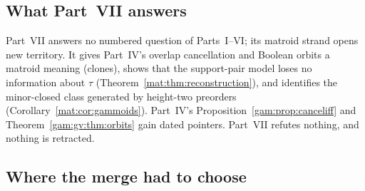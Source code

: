 \documentclass[11pt]{article}
\numberwithin{equation}{section}
\theoremstyle{definition}
\begin{document}
\subsection{What Part~VII answers}
\label{mat:sec:answers}
Part~VII answers no numbered question of Parts~I--VI; its matroid strand
opens new territory. It gives Part~IV's overlap cancellation and Boolean
orbits a matroid meaning (clones), shows that the support-pair model loses
no information about $\tau$ (Theorem~\ref{mat:thm:reconstruction}), and
identifies the minor-closed class generated by height-two preorders
(Corollary~\ref{mat:cor:gammoids}). Part~IV's
Proposition~\ref{gam:prop:canceliff} and Theorem~\ref{gam:gv:thm:orbits}
gain dated pointers. Part~VII refutes nothing, and nothing is retracted.

\subsection{Where the merge had to choose}
\label{mat:sec:merge}
\end{document}
